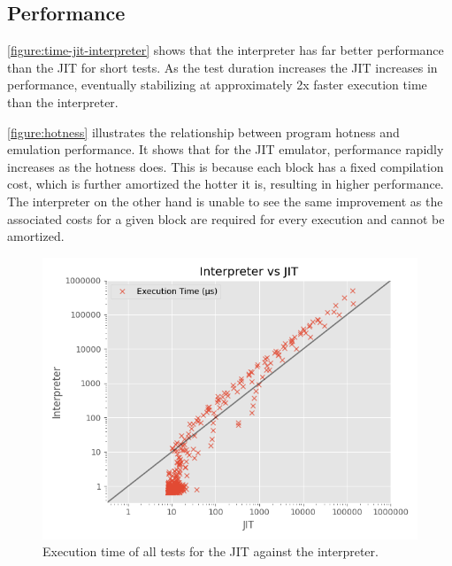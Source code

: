\subsection{Performance}






\autoref{figure:time-jit-interpreter} shows that the interpreter has far better performance than the JIT for short tests. As the test duration increases the JIT increases in performance, eventually stabilizing at approximately 2x faster execution time than the interpreter.

\autoref{figure:hotness} illustrates the relationship between program hotness and emulation performance. It shows that for the JIT emulator, performance rapidly increases as the hotness does. This is because each block has a fixed compilation cost, which is further amortized the hotter it is, resulting in higher performance. The interpreter on the other hand is unable to see the same improvement as the associated costs for a given block are required for every execution and cannot be amortized.

\begin{figure}[h]
    \centering
    \includegraphics[scale=0.75]{output/graphs/scatter/vs/JIT-vs-Interpreter-time.png}
    \caption{Execution time of all tests for the JIT against the interpreter.}
    \label{figure:time-jit-interpreter}
\end{figure}

